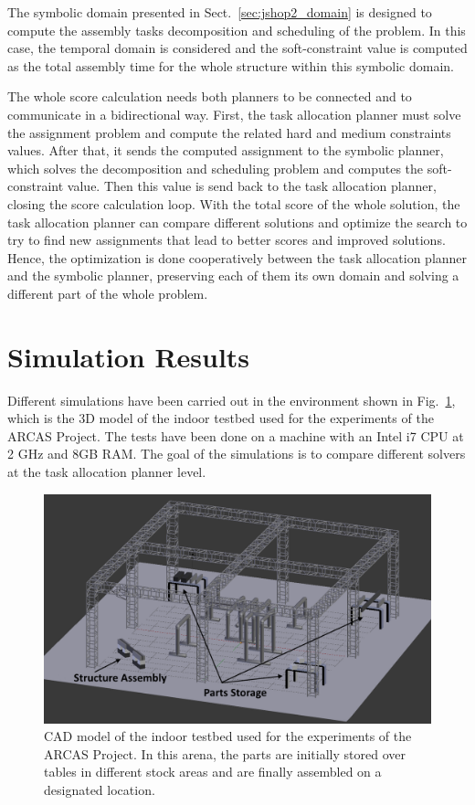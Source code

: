 \documentclass[letterpaper, 10 pt, conference]{ieeeconf}  %
\begin{document}
The symbolic domain presented in Sect.~\ref{sec:jshop2_domain} is designed to compute the assembly tasks decomposition and scheduling of the problem. In this case, the temporal domain is considered and the soft-constraint value is computed as the total assembly time for the whole structure within this symbolic domain.

The whole score calculation needs both planners to be connected and to communicate in a bidirectional way. First, the task allocation planner must solve the assignment problem and compute the related hard and medium constraints values. After that, it sends the computed assignment to the symbolic planner, which solves the decomposition and scheduling problem and computes the soft-constraint value. Then this value is send back to the task allocation planner, closing the score calculation loop. With the total score of the whole solution, the task allocation planner can compare different solutions and optimize the search to try to find new assignments that lead to better scores and improved solutions. Hence, the optimization is done cooperatively between the task allocation planner and the symbolic planner, preserving each of them its own domain and solving a different part of the whole problem.

\section{Simulation Results}
	\label{sec:results}

Different simulations have been carried out in the environment shown in Fig.~\ref{fig:environment}, which is the 3D model of the indoor testbed used for the experiments of the ARCAS Project. The tests have been done on a machine with an Intel i7 CPU at 2 GHz and 8GB RAM. The goal of the simulations is to compare different solvers at the task allocation planner level. 

\begin{figure}
    \centering
    \includegraphics[width=0.99\columnwidth]{final_scene.png}
    \caption[Environment model of the mission.]{CAD model of the indoor testbed used for the experiments of the ARCAS Project. In this arena, the parts are initially stored over tables in different stock areas and are finally assembled on a designated location.}
    \label{fig:environment}
\end{figure}
\end{document}
